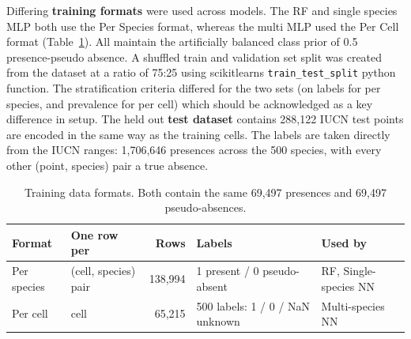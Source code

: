 \documentclass{article}
\begin{document}
Differing \textbf{training formats} were used across models. The RF and single species MLP both use the Per Species format, whereas the multi MLP used the Per Cell format (Table~\ref{tab:formats}). All maintain the artificially balanced class prior of 0.5 presence-pseudo absence. A shuffled train and validation set split was created from the dataset at a ratio of 75:25 using scikitlearns \texttt{train\_test\_split} python function\cite{JMLR:v12:pedregosa11a}. The stratification criteria differed for the two sets (on labels for per species, and prevalence for per cell) which should be acknowledged as a key difference in setup. The held out \textbf{test dataset} contains 288,122 IUCN test points are encoded in the same way as the training cells. The labels are taken directly from the IUCN ranges: 1,706,646 presences across the 500 species, with every other (point, species) pair a true absence.
\vspace{-10pt}
\begin{table}[H]
     \centering
     \begin{tabular}{@{}llrll@{}}
         \toprule
         Format & One row per & Rows & Labels & Used by \\
         \midrule
         Per species & (cell, species) pair & 138,994 & 1 present / 0 pseudo-absent & RF, Single-species NN \\
         Per cell & cell & 65,215 & 500 labels: 1 / 0 / NaN unknown & Multi-species NN \\
         \bottomrule
     \end{tabular}
     \caption{Training data formats. Both contain the same 69,497 presences and 69,497 pseudo-absences.}
     \label{tab:formats}
 \end{table}
 \vspace{-10pt}
\end{document}
